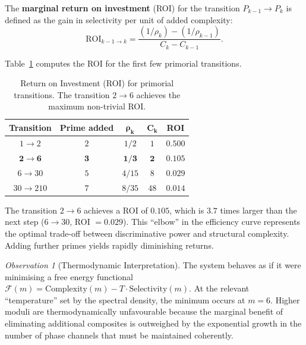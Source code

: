 \documentclass[12pt,a4paper]{article}
\theoremstyle{plain}
\theoremstyle{definition}
\theoremstyle{remark}
\newtheorem{observation}[theorem]{Observation}
\begin{document}
The \textbf{marginal return on investment} (ROI) for the transition $P_{k-1} \to P_k$ is defined as the gain in selectivity per unit of added complexity:
\begin{equation}
\text{ROI}_{k-1 \to k} = \frac{(1/\rho_k) - (1/\rho_{k-1})}{C_k - C_{k-1}}.
\label{eq:roi}
\end{equation}

Table~\ref{tab:roi} computes the ROI for the first few primorial transitions.

\begin{table}[H]
\centering
\caption{Return on Investment (ROI) for primorial transitions. The transition $2 \to 6$ achieves the maximum non-trivial ROI.}
\label{tab:roi}
\begin{tabular}{@{}ccccc@{}}
\toprule
\textbf{Transition} & \textbf{Prime added} & $\mathbf{\rho_k}$ & $\mathbf{C_k}$ & \textbf{ROI} \\
\midrule
$1 \to 2$   & $2$ & $1/2$  & $1$  & $0.500$ \\
$\mathbf{2 \to 6}$   & $\mathbf{3}$ & $\mathbf{1/3}$  & $\mathbf{2}$  & $\mathbf{0.105}$ \\
$6 \to 30$  & $5$ & $4/15$ & $8$  & $0.029$ \\
$30 \to 210$ & $7$ & $8/35$ & $48$ & $0.014$ \\
\bottomrule
\end{tabular}
\end{table}

The transition $2 \to 6$ achieves a ROI of $0.105$, which is $3.7$ times larger than the next step ($6 \to 30$, ROI $= 0.029$). This ``elbow'' in the efficiency curve represents the optimal trade-off between discriminative power and structural complexity. Adding further primes yields rapidly diminishing returns.

\begin{observation}[Thermodynamic Interpretation]
The system behaves as if it were minimising a free energy functional $\mathcal{F}(m) = \text{Complexity}(m) - T \cdot \text{Selectivity}(m)$. At the relevant ``temperature'' set by the spectral density, the minimum occurs at $m=6$. Higher moduli are thermodynamically unfavourable because the marginal benefit of eliminating additional composites is outweighed by the exponential growth in the number of phase channels that must be maintained coherently.
\end{observation}
\end{document}
